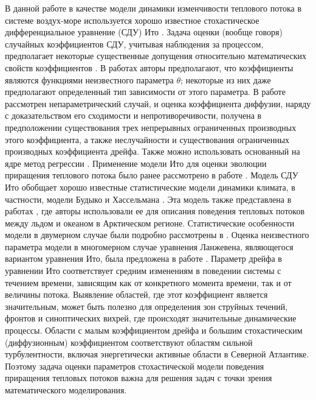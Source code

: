 В данной работе в качестве модели динамики изменчивости теплового потока в системе воздух-море используется хорошо известное стохастическое дифференциальное уравнение (СДУ) Ито \cite{Pascucci2022}. Задача оценки (вообще говоря) случайных коэффициентов СДУ, учитывая наблюдения за процессом, предполагает некоторые существенные допущения относительно математических свойств коэффициентов \cite{Yoshida1992, GenonCatalot1993, GenonCatalot1994, Wei2016}. В работах \cite{Yoshida1992, GenonCatalot1993, GenonCatalot1994, Wei2016} авторы предполагают, что коэффициенты являются функциями неизвестного параметра $\theta$; некоторые из них даже предполагают определенный тип зависимости от этого параметра. В работе \cite{FlorensZmirou1993} рассмотрен непараметрический случай, и оценка коэффициента диффузии, наряду с доказательством его сходимости и непротиворечивости, получена в предположении существования трех непрерывных ограниченных производных этого коэффициента, а также неслучайности и существования ограниченных производных коэффициента дрейфа. Также можно использовать основанный на ядре метод регрессии \cite{Lamouroux2009}.
Применение модели Ито для оценки эволюции приращения теплового потока было ранее рассмотрено в работе \cite{2021_SOME_FEATURES}. Модель СДУ Ито обобщает хорошо известные статистические модели динамики климата, в частности, модели Будыко \cite{Budyko1974} и Хассельмана \cite{Hasselmann1976}. Эта модель также представлена в работах \cite{van2021characterisation, toppaladoddi2021stochastic}, где авторы использовали ее для описания поведения тепловых потоков между льдом и океаном в Арктическом регионе. Статистические особенности модели в двумерном случае были подробно рассмотрены в \cite{Pascucci2022}. Оценка неизвестного параметра модели в многомерном случае уравнения Ланжевена, являющегося вариантом уравнения Ито, была предложена в работе \cite{Voutilainen2022}.
Параметр дрейфа в уравнении Ито соответствует средним изменениям в поведении системы с течением времени, зависящим как от конкретного момента времени, так и от величины потока. Выявление областей, где этот коэффициент является значительным, может быть полезно для определения зон струйных течений, фронтов и синоптических вихрей, где происходят значительные динамические процессы. Области с малым коэффициентом дрейфа и большим стохастическим (диффузионным) коэффициентом соответствуют областям сильной турбулентности, включая энергетически активные области в Северной Атлантике. Поэтому задача оценки параметров стохастической модели поведения приращения тепловых потоков важна для решения задач с точки зрения математического моделирования.


